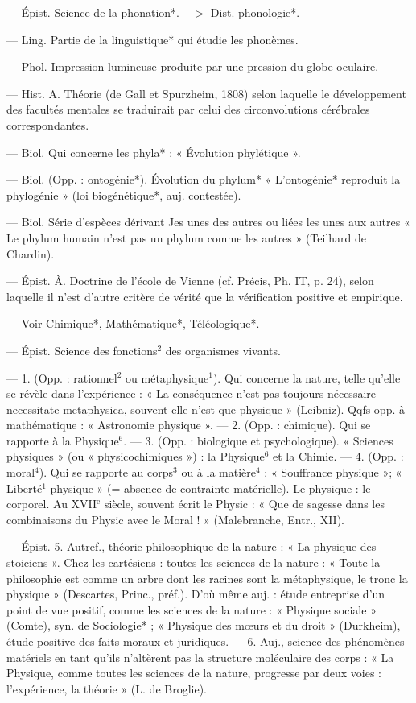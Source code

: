 \begin{itemize}[leftmargin=1cm, label=, itemsep=1pt]
 — Épist. Science de la
phonation*. $->$ Dist. phonologie*.

 — Ling. Partie de la linguistique* qui étudie les phonèmes.

 — Phol. Impression lumineuse produite par une pression du
globe oculaire.

 — Hist. A. Théorie (de
Gall et Spurzheim, 1808) selon laquelle le développement des facultés
mentales se traduirait par celui des
circonvolutions cérébrales correspondantes.

 — Biol. Qui concerne les
phyla* : « Évolution phylétique ».

 — Biol. (Opp. : ontogénie*). Évolution du phylum*
« L’ontogénie* reproduit la phylogénie » (loi biogénétique*, auj. contestée).

 — Biol. Série d'espèces dérivant Jes unes des autres ou liées les
unes aux autres « Le phylum
humain n’est pas un phylum comme
les autres » (Teilhard de Chardin).

 — Épist. À. Doctrine de
l’école de Vienne (cf. Précis, Ph. IT,
p. 24), selon laquelle il n’est d'autre
critère de vérité que la vérification
positive et empirique.

 — Voir Chimique*, Mathématique*, Téléologique*.

 — Épist. Science des
fonctions$^2$ des organismes vivants.

 — 1. (Opp. : rationnel$^2$
ou métaphysique$^1$). Qui concerne la
nature, telle qu’elle se révèle dans
l'expérience : « La conséquence n’est
pas toujours nécessaire necessitate
metaphysica, souvent elle n’est que
physique » (Leibniz). Qqfs opp. à
mathématique : « Astronomie physique ». — 2. (Opp. : chimique). Qui
se rapporte à la Physique$^6$. — 3.
(Opp. : biologique et psychologique).
« Sciences physiques » (ou « physicochimiques ») : la Physique$^6$ et la
Chimie. — 4. (Opp. : moral$^4$). Qui se
rapporte au corps$^3$ ou à la matière$^4$ :
« Souffrance physique »; « Liberté$^1$
physique » (= absence de contrainte
matérielle). Le physique : le corporel.
Au {\footnotesize XVII}$^\text{e}$ siècle, souvent écrit le
Physic : « Que de sagesse dans les
combinaisons du Physic avec le
Moral ! » (Malebranche, Entr., XII).

 — Épist. 5.
Autref., théorie philosophique de la
nature : « La physique des stoiciens ». Chez les cartésiens : toutes
les sciences de la nature : « Toute la
philosophie est comme un arbre
dont les racines sont la métaphysique, le tronc la physique » (Descartes, Princ., préf.). D'où même
auj. : étude entreprise d’un point de
vue positif, comme les sciences de
la nature : « Physique sociale »
(Comte), syn. de Sociologie* ; « Physique des mœurs et du droit » (Durkheim), étude positive des faits moraux et juridiques. — 6. Auj.,
science des phénomènes matériels en
tant qu'ils n’altèrent pas la structure moléculaire des corps : « La
Physique, comme toutes les sciences
de la nature, progresse par deux
voies : l’expérience, la théorie »
(L. de Broglie).


\end{itemize}
